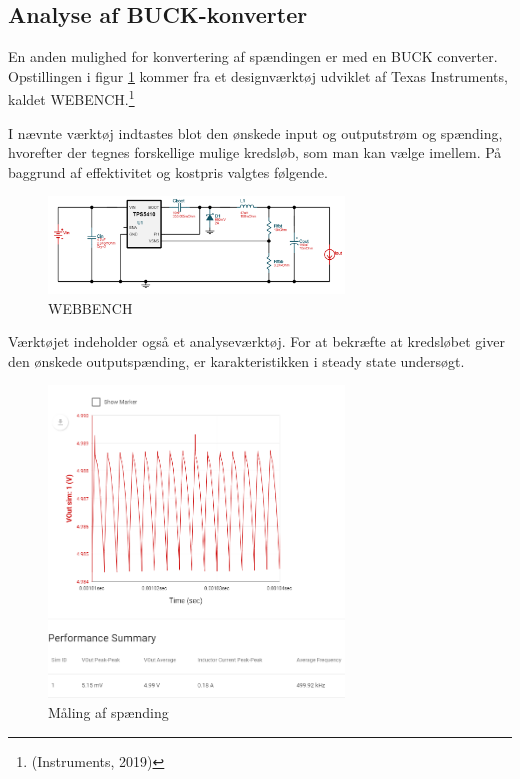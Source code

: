 \subsection{Analyse af BUCK-konverter}
\label{sec:analyse-af-buck}

En anden mulighed for konvertering af spændingen er med en BUCK converter. Opstillingen i figur \ref{fig:j4} kommer fra et designværktøj udviklet af Texas Instruments, kaldet WEBENCH.\footnote{(Instruments, 2019)}

I nævnte værktøj indtastes blot den ønskede input og outputstrøm og spænding, hvorefter der tegnes forskellige mulige kredsløb, som man kan vælge imellem. På baggrund af effektivitet og kostpris valgtes følgende. 

\begin{figure}[h]
  \centering
  \includegraphics[width=0.7\textwidth]{./figurer/j4.png}
  \caption{WEBBENCH}
  \label{fig:j4}
\end{figure}

Værktøjet indeholder også et analyseværktøj. For at bekræfte at kredsløbet giver den ønskede outputspænding, er  karakteristikken i steady state undersøgt.
\clearpage
\begin{figure}[h]
  \centering
  \includegraphics[width=0.7\textwidth]{./figurer/j5.png}
  \caption{Måling af spænding}
  \label{fig:j5}
\end{figure}

